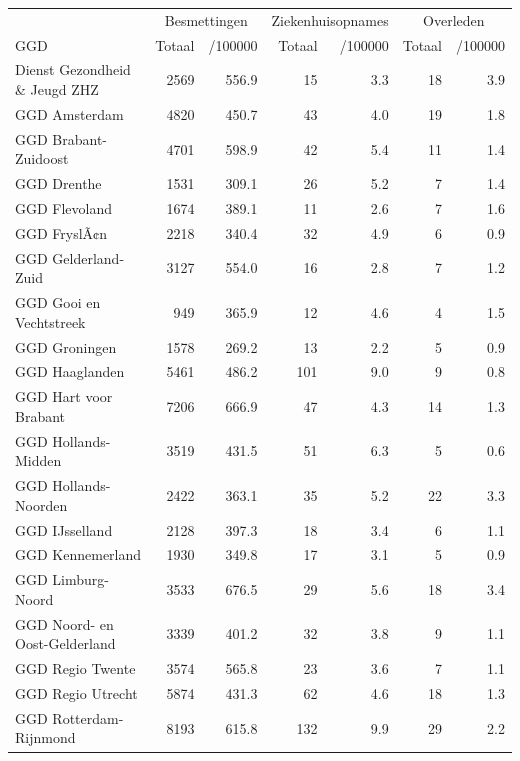 \documentclass[
  english,
  man,floatsintext]{apa6}
\begin{document}
\begin{table}
\centering\begingroup\fontsize{10}{12}\selectfont

\begin{threeparttable}
\begin{tabular}{lrrrrrr}
\toprule
\multicolumn{1}{c}{ } & \multicolumn{2}{c}{Besmettingen} & \multicolumn{2}{c}{Ziekenhuisopnames} & \multicolumn{2}{c}{Overleden} \\
\cmidrule(l{3pt}r{3pt}){2-3} \cmidrule(l{3pt}r{3pt}){4-5} \cmidrule(l{3pt}r{3pt}){6-7}
GGD & Totaal & /100000 & Totaal & /100000 & Totaal & /100000\\
\midrule
Dienst Gezondheid \& Jeugd ZHZ & 2569 & 556.9 & 15 & 3.3 & 18 & 3.9\\
GGD Amsterdam & 4820 & 450.7 & 43 & 4.0 & 19 & 1.8\\
GGD Brabant-Zuidoost & 4701 & 598.9 & 42 & 5.4 & 11 & 1.4\\
GGD Drenthe & 1531 & 309.1 & 26 & 5.2 & 7 & 1.4\\
GGD Flevoland & 1674 & 389.1 & 11 & 2.6 & 7 & 1.6\\
GGD FryslÃ¢n & 2218 & 340.4 & 32 & 4.9 & 6 & 0.9\\
GGD Gelderland-Zuid & 3127 & 554.0 & 16 & 2.8 & 7 & 1.2\\
GGD Gooi en Vechtstreek & 949 & 365.9 & 12 & 4.6 & 4 & 1.5\\
GGD Groningen & 1578 & 269.2 & 13 & 2.2 & 5 & 0.9\\
GGD Haaglanden & 5461 & 486.2 & 101 & 9.0 & 9 & 0.8\\
GGD Hart voor Brabant & 7206 & 666.9 & 47 & 4.3 & 14 & 1.3\\
GGD Hollands-Midden & 3519 & 431.5 & 51 & 6.3 & 5 & 0.6\\
GGD Hollands-Noorden & 2422 & 363.1 & 35 & 5.2 & 22 & 3.3\\
GGD IJsselland & 2128 & 397.3 & 18 & 3.4 & 6 & 1.1\\
GGD Kennemerland & 1930 & 349.8 & 17 & 3.1 & 5 & 0.9\\
GGD Limburg-Noord & 3533 & 676.5 & 29 & 5.6 & 18 & 3.4\\
GGD Noord- en Oost-Gelderland & 3339 & 401.2 & 32 & 3.8 & 9 & 1.1\\
GGD Regio Twente & 3574 & 565.8 & 23 & 3.6 & 7 & 1.1\\
GGD Regio Utrecht & 5874 & 431.3 & 62 & 4.6 & 18 & 1.3\\
GGD Rotterdam-Rijnmond & 8193 & 615.8 & 132 & 9.9 & 29 & 2.2\\

\end{tabular}
\end{threeparttable}
\end{table}
\end{document}
